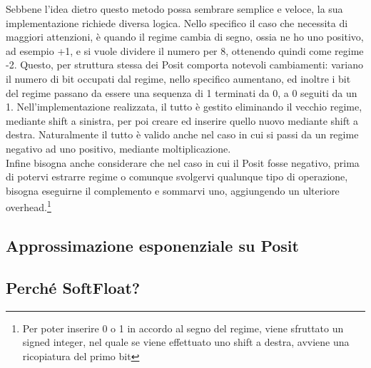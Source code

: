\documentclass[a4paper,11pt]{article}
\begin{document}
Sebbene l'idea dietro questo metodo possa sembrare semplice e veloce, la sua implementazione richiede diversa logica. Nello specifico il caso che necessita di maggiori attenzioni, è quando il regime cambia di segno, ossia ne ho uno positivo, ad esempio +1, e si vuole dividere il numero per 8, ottenendo quindi come regime -2. Questo, per struttura stessa dei Posit comporta notevoli cambiamenti: variano il numero di bit occupati dal regime, nello specifico aumentano, ed inoltre i bit del regime passano da essere una sequenza di 1 terminati da 0, a 0 seguiti da un 1. 
Nell'implementazione realizzata, il tutto è gestito eliminando il vecchio regime, mediante shift a sinistra, per poi creare ed inserire quello nuovo mediante shift a destra. Naturalmente il tutto è valido anche nel caso in cui si passi da un regime negativo ad uno positivo, mediante moltiplicazione.\\
Infine bisogna anche considerare che nel caso in cui il Posit fosse negativo, prima di potervi estrarre regime o comunque svolgervi qualunque tipo di operazione, bisogna eseguirne il complemento e sommarvi uno, aggiungendo un ulteriore overhead.\footnote{Per poter inserire 0 o 1 in accordo al segno del regime, viene sfruttato un signed integer, nel quale se viene effettuato uno shift a destra, avviene una ricopiatura del primo bit}

\subsection{Approssimazione esponenziale su Posit}

\subsection{Perché SoftFloat?}
\newpage
	
	\printbibliography[title=Bibliografia]

	
\end{document}
